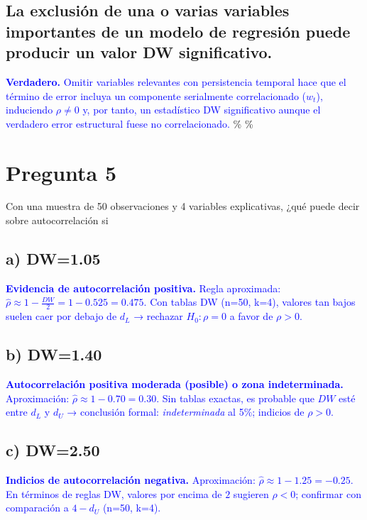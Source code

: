 \documentclass[10pt]{article}
\begin{document}
\subsection{La exclusión de una o varias variables importantes de un modelo de regresión puede producir un valor DW significativo.}
\textcolor{blue}{
    \textbf{Verdadero.} Omitir variables relevantes con persistencia temporal hace que el término de error incluya un componente serialmente correlacionado ($w_t$), induciendo $\rho\neq0$ y, por tanto, un estadístico DW significativo aunque el verdadero error estructural fuese no correlacionado.
}
\%%
\%%
\section{Pregunta 5}
Con una muestra de 50 observaciones y 4 variables explicativas, ¿qué puede decir sobre autocorrelación si
\subsection{a) DW=1.05}
\textcolor{blue}{
\textbf{Evidencia de autocorrelación positiva.} Regla aproximada: $\hat\rho\approx1-\tfrac{DW}{2}=1-0.525=0.475$. Con tablas DW (n=50, k=4), valores tan bajos suelen caer por debajo de $d_L$ → rechazar $H_0:\rho=0$ a favor de $\rho>0$.
}
\subsection{b) DW=1.40}
\textcolor{blue}{
\textbf{Autocorrelación positiva moderada (posible) o zona indeterminada.} Aproximación: $\hat\rho\approx1-0.70=0.30$. Sin tablas exactas, es probable que $DW$ esté entre $d_L$ y $d_U$ → conclusión formal: \emph{indeterminada} al 5\%; indicios de $\rho>0$.
}
\subsection{c) DW=2.50}
\textcolor{blue}{
\textbf{Indicios de autocorrelación negativa.} Aproximación: $\hat\rho\approx1-1.25=-0.25$. En términos de reglas DW, valores por encima de $2$ sugieren $\rho<0$; confirmar con comparación a $4-d_U$ (n=50, k=4).
}
\end{document}
